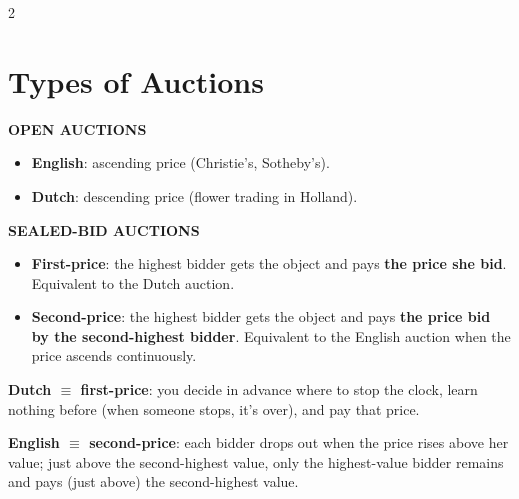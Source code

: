 \documentclass[a4paper,9pt]{extarticle}
\begin{document}
\begin{multicols}{2}
\begin{itemize}
\end{itemize}



\section{Types of Auctions}


\begin{definition}

\textbf{OPEN AUCTIONS}

\begin{itemize}

\item \textbf{English}: ascending price (Christie's, Sotheby's).

\item \textbf{Dutch}: descending price (flower trading in Holland).

\end{itemize}

\textbf{SEALED-BID AUCTIONS}

\begin{itemize}

\item \textbf{First-price}: the highest bidder gets the object and pays \textbf{the price she
bid}. Equivalent to the Dutch auction.

\item \textbf{Second-price}: the highest bidder gets the object and pays \textbf{the price
bid by the second-highest bidder}. Equivalent to the English auction when the price ascends
continuously.

\end{itemize}

\end{definition}


\begin{important}

\textbf{Dutch $\equiv$ first-price}: you decide in advance where to stop the clock, learn
nothing before (when someone stops, it's over), and pay that price.

\textbf{English $\equiv$ second-price}: each bidder drops out when the price rises above her
value; just above the second-highest value, only the highest-value bidder remains and pays
(just above) the second-highest value.

\end{important}




\end{multicols}
\end{document}
